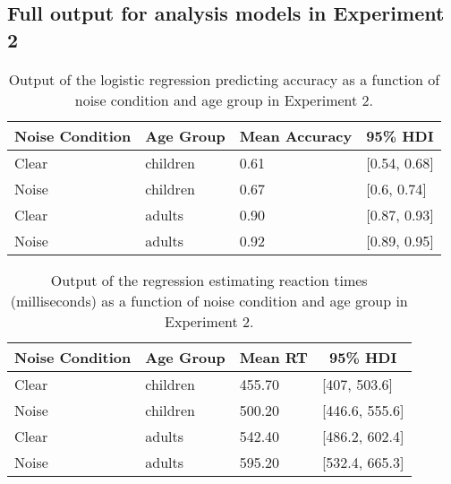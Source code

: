 \documentclass[,man,floatsintext]{apa6}
\begin{document}
\begin{appendix}
\hypertarget{full-output-for-analysis-models-in-experiment-2}{%
\section{Full output for analysis models in Experiment
2}\label{full-output-for-analysis-models-in-experiment-2}}

\begin{table}[h]
\begin{center}
\begin{threeparttable}
\caption{\label{tab:noise-acc-model}Output of the logistic regression predicting accuracy as a function of noise condition and age group in Experiment 2.}
\begin{tabular}{llll}
\toprule
Noise Condition & \multicolumn{1}{c}{Age Group} & \multicolumn{1}{c}{Mean Accuracy} & \multicolumn{1}{c}{95\% HDI}\\
\midrule
Clear & children & 0.61 & [0.54, 0.68]\\
Noise & children & 0.67 & [0.6, 0.74]\\
Clear & adults & 0.90 & [0.87, 0.93]\\
Noise & adults & 0.92 & [0.89, 0.95]\\
\bottomrule
\end{tabular}
\end{threeparttable}
\end{center}
\end{table}

\begin{table}[h]
\begin{center}
\begin{threeparttable}
\caption{\label{tab:noise-rt-model}Output of the regression estimating reaction times (milliseconds) as a function of noise condition and age group in Experiment 2.}
\begin{tabular}{llll}
\toprule
Noise Condition & \multicolumn{1}{c}{Age Group} & \multicolumn{1}{c}{Mean RT} & \multicolumn{1}{c}{95\% HDI}\\
\midrule
Clear & children & 455.70 & [407, 503.6]\\
Noise & children & 500.20 & [446.6, 555.6]\\
Clear & adults & 542.40 & [486.2, 602.4]\\
Noise & adults & 595.20 & [532.4, 665.3]\\
\bottomrule
\end{tabular}
\end{threeparttable}
\end{center}
\end{table}


\end{appendix}
\end{document}
